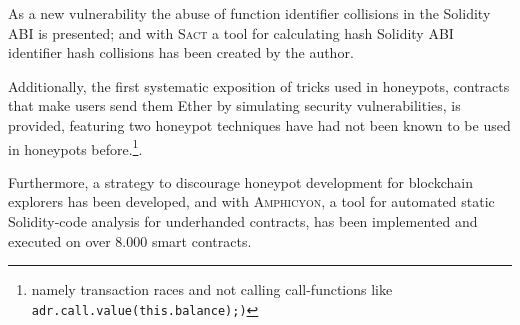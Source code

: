 As a new vulnerability the abuse of function identifier collisions in the Solidity ABI is presented; and with \textsc{Sact} a tool for calculating hash Solidity ABI identifier hash collisions has been created by the author.

Additionally, the first systematic exposition of tricks used in honeypots, contracts that make users send them Ether by simulating security vulnerabilities, is provided, featuring two honeypot techniques have had not been known to be used in honeypots before.\footnote{namely transaction races and not calling call-functions like \texttt{adr.call.value(this.balance);)}}.

Furthermore, a strategy to discourage honeypot development for blockchain explorers has been developed, and with \textsc{Amphicyon}, a tool for automated static Solidity-code analysis for underhanded contracts, has been implemented and executed on over 8.000 smart contracts.

\pagebreak{}

